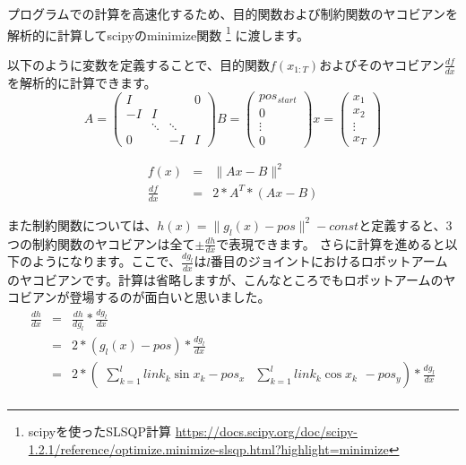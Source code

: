 プログラムでの計算を高速化するため、目的関数および制約関数のヤコビアンを解析的に計算してscipyのminimize関数
\footnote{scipyを使ったSLSQP計算 \url{https://docs.scipy.org/doc/scipy-1.2.1/reference/optimize.minimize-slsqp.html?highlight=minimize}}
に渡します。

以下のように変数を定義することで、目的関数$f(x_{1:T})$およびそのヤコビアン$\displaystyle \frac{df}{dx}$を解析的に計算できます。
\begin{equation*}
  A =
  \begin{pmatrix}
    I      &        &        & 0      \\
    -I     & I      &        &        \\
           & \ddots & \ddots &        \\
    0      &        & -I     & I
  \end{pmatrix}
  B =
  \begin{pmatrix}
    pos_{start} \\
    0           \\
    \vdots      \\
    0
  \end{pmatrix}
  x =
  \begin{pmatrix}
    x_1    \\
    x_2    \\
    \vdots \\
    x_T
  \end{pmatrix}
\end{equation*}

\begin{eqnarray*}
  f(x) &=& \|Ax - B\|^2 \\
  \frac{df}{dx} &=& 2 * A^T *(Ax - B)
\end{eqnarray*}

\clearpage
また制約関数については、$h(x) = \|g_{l}(x) - pos\|^2 - const$と定義すると、3つの制約関数のヤコビアンは全て$\displaystyle \pm \frac{dh}{dx}$で表現できます。
さらに計算を進めると以下のようになります。ここで、$\displaystyle \frac{dg_{l}}{dx}$は$l$番目のジョイントにおけるロボットアームのヤコビアンです。計算は省略しますが、こんなところでもロボットアームのヤコビアンが登場するのが面白いと思いました。
\begin{eqnarray*}
  \frac{dh}{dx} &=& \frac{dh}{dg_{l}} * \frac{dg_{l}}{dx} \\
                &=& 2 * (g_{l}(x) - pos) * \frac{dg_{l}}{dx} \\
                &=& 2 * \left( \begin{array}{cc} \sum_{k=1}^{l} link_k\sin{x_k} - pos_x & \sum_{k=1}^{l} link_k\cos{x_k} \end{array} - pos_y \right) * \frac{dg_{l}}{dx} \\
\end{eqnarray*}

